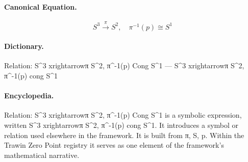 \paragraph{Canonical Equation.}
\[
S^3 \xrightarrow{\pi} S^2, \quad \pi^{-1}(p) \cong S^1
\]

\paragraph{Dictionary.}
Relation: S\textasciicircum{}3 xrightarrowπ S\textasciicircum{}2, π\textasciicircum{}-1(p) Cong S\textasciicircum{}1 — S\textasciicircum{}3 xrightarrowπ S\textasciicircum{}2, π\textasciicircum{}-1(p) cong S\textasciicircum{}1

\paragraph{Encyclopedia.}
Relation: S\textasciicircum{}3 xrightarrowπ S\textasciicircum{}2, π\textasciicircum{}-1(p) Cong S\textasciicircum{}1 is a symbolic expression, written S\textasciicircum{}3 xrightarrowπ S\textasciicircum{}2, π\textasciicircum{}-1(p) cong S\textasciicircum{}1. It introduces a symbol or relation used elsewhere in the framework. It is built from π, S, p. Within the Trawin Zero Point registry it serves as one element of the framework's mathematical narrative.
